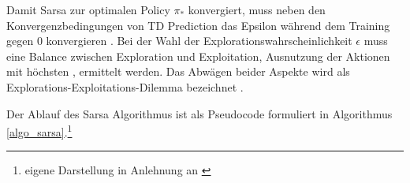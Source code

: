 Damit Sarsa zur optimalen Policy $\pi_*$ konvergiert, muss neben den Konvergenzbedingungen von TD Prediction das Epsilon während dem Training gegen 0 konvergieren \cite[S. 129]{suttonReinforcementLearningIntroduction2018}. 
Bei der Wahl der Explorationswahrscheinlichkeit $\epsilon$ muss eine Balance zwischen Exploration und Exploitation, \dahe Ausnutzung der Aktionen mit höchsten \qValue, ermittelt werden. 
Das Abwägen beider Aspekte wird als Explorations-Exploitations-Dilemma bezeichnet \cite[S. 3]{suttonReinforcementLearningIntroduction2018}.

Der Ablauf des Sarsa Algorithmus ist als Pseudocode formuliert in Algorithmus \ref{algo_sarsa}.\footnote{eigene Darstellung in Anlehnung an \cite[S. 130]{suttonReinforcementLearningIntroduction2018}}

